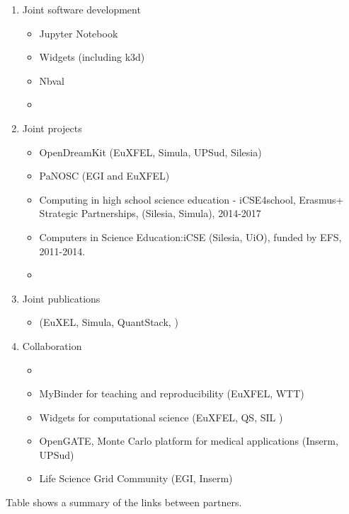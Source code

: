 \begin{enumerate}
\item Joint software development
  \begin{itemize}
  \item Jupyter Notebook 
  \item Widgets (including k3d)
  \item Nbval
  \item {}
  \end{itemize}

\item Joint projects
  \begin{itemize}
  \item OpenDreamKit (EuXFEL, Simula, UPSud, Silesia)
  \item PaNOSC (EGI and EuXFEL)
  \item Computing in high school science education - iCSE4school, Erasmus+ Strategic Partnerships, (Silesia, Simula), 2014-2017
  \item Computers in Science Education:iCSE (Silesia, UiO), funded by EFS, 2011-2014.
  \item {}
  \end{itemize}
\item Joint publications
  \begin{itemize}
  \item \cite{Kluyver2017} (EuXEL, Simula, QuantStack, )
  \end{itemize}

\item Collaboration
  \begin{itemize}
  \item {}

  \item MyBinder for teaching and reproducibility (EuXFEL, WTT)
  \item Widgets for computational science (EuXFEL, QS, SIL )
  \item OpenGATE, Monte Carlo platform for medical applications (Inserm, UPSud)
  \item Life Science Grid Community (EGI, Inserm)
 \end{itemize}
\end{enumerate}

Table  shows a summary of the links
between partners.


